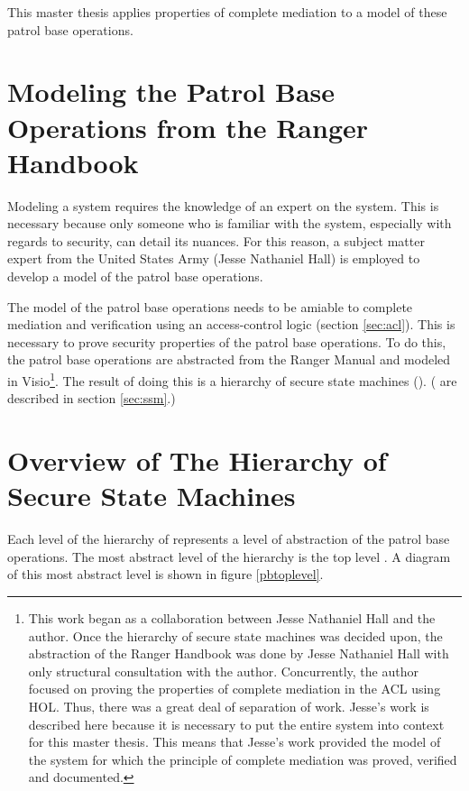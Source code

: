\documentclass[../../main/main.tex]{subfiles}
\begin{document}
This master thesis applies properties of complete mediation to a model of these patrol base operations.

\section{Modeling the Patrol Base Operations from the Ranger Handbook}\label{sec:modelingpb}
\glsresetall[\acronymtype]

Modeling a system requires the knowledge of an expert on the system.  This is necessary because only someone who is familiar with the system, especially with regards to security, can detail its nuances.  For this reason, a subject matter expert from the United States Army (Jesse Nathaniel Hall) is employed to develop a model of the patrol base operations. 

The model of the patrol base operations needs to be amiable to complete mediation and verification using an access-control logic (section \ref{sec:acl}).  This is necessary to prove security properties of the patrol base operations.  To do this, the patrol base operations are abstracted from the Ranger Manual and modeled in Visio\footnote{This work began as a collaboration between Jesse Nathaniel Hall and the author.  Once the hierarchy of secure state machines was decided upon, the abstraction of the Ranger Handbook was done by Jesse Nathaniel Hall with only structural consultation with the author.  Concurrently, the author focused on proving the properties of complete mediation in the ACL using HOL.  Thus, there was a great deal of separation of work.  Jesse's work is described here because it is necessary to put the entire system into context for this master thesis.  This means that Jesse's work provided the model of the system for which the principle of complete mediation was proved, verified and documented.}.  The result of doing this is a hierarchy of secure state machines (). ( are described in section \ref{sec:ssm}.)  

\section{Overview of The Hierarchy of Secure State Machines}\label{sec:overview}

Each level of the hierarchy of  represents a level of abstraction of the patrol base operations. The most abstract level of the hierarchy is the top level .  A diagram of this most abstract level is shown in figure \ref{pbtoplevel}.
\end{document}
